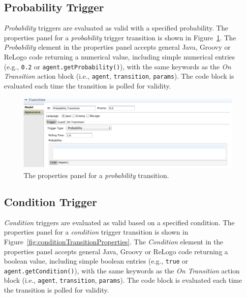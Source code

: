 \documentclass[11pt]{amsart}
\begin{document}
\subsection{Probability Trigger}
\emph{Probability} triggers are evaluated as valid with a specified probability. The properties panel for a \emph{probability} trigger transition is shown in Figure~\ref{fig:probabilityTransitionProperties}. The \emph{Probability} element in the properties panel accepts general Java, Groovy or ReLogo code returning a numerical value, including simple numerical entries (e.g., \texttt{0.2} or \texttt{agent.getProbability()}), with the same keywords as the \emph{On Transition} action block (i.e., \texttt{agent}, \texttt{transition}, \texttt{params}). The code block is evaluated each time the transition is polled for validity.

\begin{figure}
\begin{center}
\vspace{.2in}
\centerline {
\includegraphics[width=5in]{StatechartsImages/ProbabilityTransitionProperties.png}
}
\caption{The properties panel for a \emph{probability} transition.}
\label{fig:probabilityTransitionProperties}
\end{center}
\end{figure}
\clearpage

\subsection{Condition Trigger}
\label{sec:conditionTransition}
\emph{Condition} triggers are evaluated as valid based on a specified condition. The properties panel for a \emph{condition} trigger transition is shown in Figure~\ref{fig:conditionTransitionProperties}. The \emph{Condition} element in the properties panel accepts general Java, Groovy or ReLogo code returning a boolean value, including simple boolean entries (e.g., \texttt{true} or \texttt{agent.getCondition()}), with the same keywords as the \emph{On Transition} action block (i.e., \texttt{agent}, \texttt{transition}, \texttt{params}). The code block is evaluated each time the transition is polled for validity.
\end{document}
